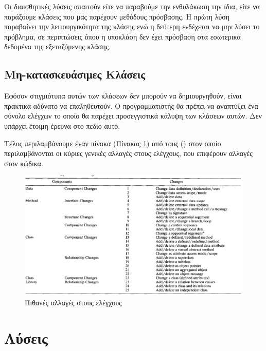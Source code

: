 \documentclass[12pt]{article}
\begin{document}
\par Οι διαισθητικές λύσεις απαιτούν  είτε να παραβούμε την ενθυλάκωση την ίδια, είτε να παράξουμε κλάσεις που μας παρέχουν μεθόδους πρόσβασης. Η πρώτη λύση παραβαίνει την λειτουργικότητα της κλάσης ενώ η δεύτερη ενδέχεται να μην λύσει το πρόβλημα, σε περιπτώσεις όπου η υποκλάση δεν έχει πρόσβαση στα εσωτερικά δεδομένα της εξεταζόμενης κλάσης.

\subsection{Μη-κατασκευάσιμες Κλάσεις}

Εφόσον στιγμιότυπα αυτών των κλάσεων δεν μπορούν να δημιουργηθούν, είναι πρακτικά αδύνατο να επαληθευτούν. Ο προγραμματιστής θα πρέπει να αναπτύξει ένα σύνολο ελέγχων το οποίο θα παρέχει προσεγγιστικά κάλυψη των κλάσεων αυτών. Δεν υπάρχει έτοιμη έρευνα στο πεδίο αυτό.\newline

\par Τέλος περιλαμβάνουμε έναν πίνακα (Πίνακας \ref{fig:panos}) από τους (\textcite{kung}) στον οποίο περιλαμβάνονται οι κύριες γενικές αλλαγές στους ελέγχους, που επιφέρουν αλλαγές στον κώδικα.

\begin{figure}
\label{fig:panos}
\caption{Πιθανές αλλαγές στους ελέγχους}
\includegraphics[width=\textwidth,height=\textheight,keepaspectratio]{code_changes_table.PNG}
\end{figure}

\section{Λύσεις}
\end{document}
